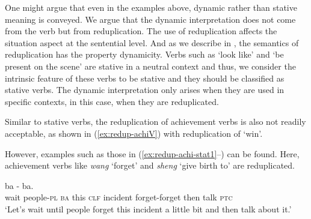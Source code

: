 One might argue that even in the examples above, dynamic rather than stative meaning is conveyed.
We argue that the dynamic interpretation does not come from the verb but from reduplication.
The use of reduplication affects the situation aspect at the sentential level.
And as we describe in , the semantics of reduplication has the property dynamicity.
Verbs such as  `look like' and  `be present on the scene' are stative in a neutral context and thus, we consider the intrinsic feature of these verbs to be stative
and they should be classified as stative verbs.
The dynamic interpretation only arises when they are used in specific contexts, in this case, when they are reduplicated.

Similar to stative verbs, the reduplication of achievement verbs is also not readily acceptable,
as shown in (\ref{ex:redup-achiV}) with reduplication of  `win'.

\label{ex:redup-achiV}
\z

However, examples such as those in (\ref{ex:redup-achi-stat1}--) can be found.
Here, achievement verbs like \textit{wang} `forget' and \textit{sheng} `give birth to' are reduplicated.

\settowidth{}


\ea
\ea\label{ex:redup-achi-stat1}
\gll {}  ba    -   ba.\footnotemark\\
wait people-\textsc{pl} \textsc{ba} this \textsc{clf} incident forget-forget then talk \textsc{ptc}\\
\glt `Let's wait until people forget this incident a little bit and then talk about it.'\\

